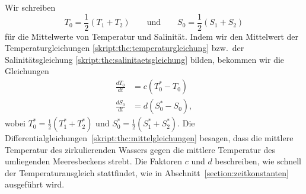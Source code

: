 Wir schreiben
\[
T_0
=
\frac12(T_1+T_2)
\qquad\text{und}\qquad
S_0
=
\frac12(S_1+S_2)
\]
für die Mittelwerte von Temperatur und Salinität.
Indem wir den Mittelwert der Temperaturgleichungen
\eqref{skript:thc:temperaturgleichung}
bzw.~der Salinitätsgleichung \eqref{skript:thc:salinitaetsgleichung} bilden,
bekommen wir die Gleichungen
\begin{equation}
\begin{aligned}
\frac{dT_0}{dt}
&=
c(T_0^*-T_0)
\\
\frac{dS_0}{dt}
&=
d(S_0^*-S_0),
\end{aligned}
\label{skript:thc:mittelgleichung}
\end{equation}
wobei $T_0^* = \frac12(T_1^*+T_2^*)$ und $S_0^* = \frac12(S_1^*+S_2^*)$.
Die Differentialgleichungen~\ref{skript:thc:mittelgleichungen} 
besagen, dass die mittlere Temperatur des zirkulierenden Wassers
gegen die mittlere Temperatur des umliegenden Meeresbeckens strebt.
Die Faktoren $c$ und $d$ beschreiben, wie schnell der Temperaturausgleich
stattfindet, wie in Abschnitt~\ref{section:zeitkonstanten} ausgeführt wird.

